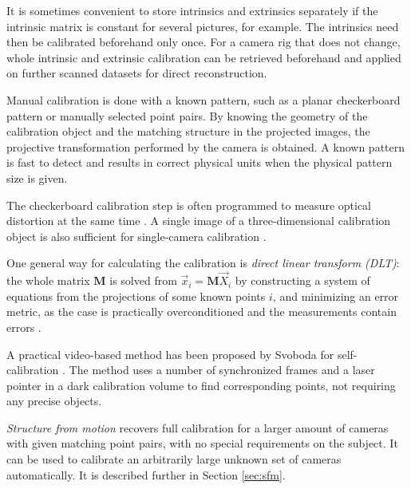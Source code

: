 It is sometimes convenient to store intrinsics and extrinsics separately if the intrinsic matrix is constant for several pictures, for example.
The intrinsics need then be calibrated beforehand only once.
For a camera rig that does not change, whole intrinsic and extrinsic calibration can be retrieved beforehand and applied on further scanned datasets for direct reconstruction.

Manual calibration is done with a known pattern, such as a planar checkerboard pattern \cite{chuang2002performance,zhang2000flexible} or manually selected point pairs.
By knowing the geometry of the calibration object and the matching structure in the projected images, the projective transformation performed by the camera is obtained.
A known pattern is fast to detect and results in correct physical units when the physical pattern size is given.

The checkerboard calibration step is often programmed to measure optical distortion at the same time \cite{opencv,camcalmatlab}.
A single image of a three-dimensional calibration object is also sufficient for single-camera calibration \cite[p. 181]{hartley03multiview}.

One general way for calculating the calibration is \emph{direct linear transform (DLT)}:
the whole matrix $\bm M$ is solved from $\vec x_i = \bm M \vec X_i$ by constructing a system of equations from the projections of some known points $i$, and minimizing an error metric, as the case is practically overconditioned and the measurements contain errors \cite{hartley03multiview}.

A practical video-based method has been proposed by Svoboda for self-calibration \cite{svoboda2005convenient}.
The method uses a number of synchronized frames and a laser pointer in a dark calibration volume to find corresponding points, not requiring any precise objects.

\emph{Structure from motion} recovers full calibration for a larger amount of cameras with given matching point pairs, with no special requirements on the subject.
It can be used to calibrate an arbitrarily large unknown set of cameras automatically.
It is described further in Section \ref{sec:sfm}.


